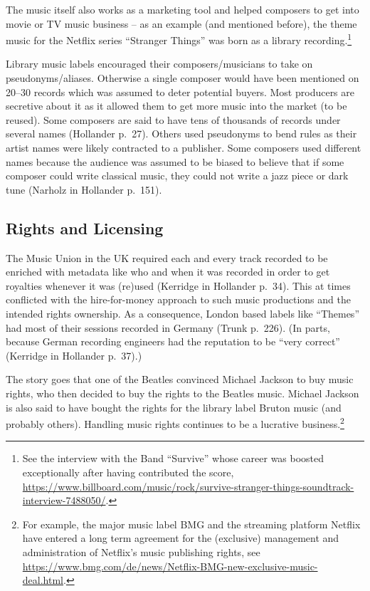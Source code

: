 \documentclass[a4paper,
fontsize=11pt,
oneside,
numbers=noperiodatend,
parskip=half-,
bibliography=totoc,
final
]{scrartcl}
\begin{document}
The music itself also works as a marketing tool and helped composers to
get into movie or TV music business -- as an example (and mentioned
before), the theme music for the Netflix series \enquote{Stranger
Things} was born as a library recording.\footnote{See the interview with
  the Band \enquote{Survive} whose career was boosted exceptionally
  after having contributed the score,
  \url{https://www.billboard.com/music/rock/survive-stranger-things-soundtrack-interview-7488050/}.}

Library music labels encouraged their composers/musicians to take on
pseudonyms/aliases. Otherwise a single composer would have been
mentioned on 20--30 records which was assumed to deter potential buyers.
Most producers are secretive about it as it allowed them to get more
music into the market (to be reused). Some composers are said to have
tens of thousands of records under several names (Hollander p.~27).
Others used pseudonyms to bend rules as their artist names were likely
contracted to a publisher. Some composers used different names because
the audience was assumed to be biased to believe that if some composer
could write classical music, they could not write a jazz piece or dark
tune (Narholz in Hollander p.~151).

\hypertarget{rights-and-licensing}{%
\subsection{Rights and Licensing}\label{rights-and-licensing}}

The Music Union in the UK required each and every track recorded to be
enriched with metadata like who and when it was recorded in order to get
royalties whenever it was (re)used (Kerridge in Hollander p.~34). This
at times conflicted with the hire-for-money approach to such music
productions and the intended rights ownership. As a consequence, London
based labels like \enquote{Themes} had most of their sessions recorded
in Germany (Trunk p.~226). (In parts, because German recording engineers
had the reputation to be \enquote{very correct} (Kerridge in Hollander
p.~37).)

The story goes that one of the Beatles convinced Michael Jackson to buy
music rights, who then decided to buy the rights to the Beatles music.
Michael Jackson is also said to have bought the rights for the library
label Bruton music (and probably others). Handling music rights
continues to be a lucrative business.\footnote{For example, the major
  music label BMG and the streaming platform Netflix have entered a long
  term agreement for the (exclusive) management and administration of
  Netflix's music publishing rights, see
  \url{https://www.bmg.com/de/news/Netflix-BMG-new-exclusive-music-deal.html}.}
\end{document}
